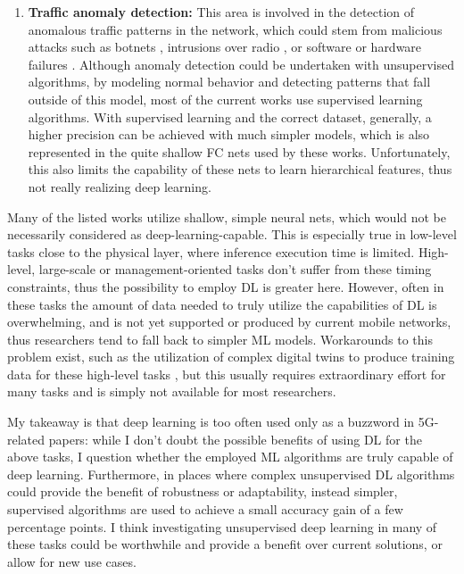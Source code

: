\begin{enumerate}[label=\textbf{\alph*})]
				\item
					\textbf{Traffic anomaly detection:}
					This area is involved in the detection of anomalous traffic patterns in the network, which could stem from malicious attacks such as botnets \cite{anomaly_botnet}, intrusions over radio \cite{anomaly_intrusion}, or software or hardware failures \cite{anomaly_sleeping}.
					Although anomaly detection could be undertaken with unsupervised algorithms, by modeling normal behavior and detecting patterns that fall outside of this model, most of the current works use supervised learning algorithms.
					With supervised learning and the correct dataset, generally, a higher precision can be achieved with much simpler models, which is also represented in the quite shallow \ac{FC} nets used by these works.
					Unfortunately, this also limits the capability of these nets to learn hierarchical features, thus not really realizing deep learning.		
			\end{enumerate}
		
			Many of the listed works utilize shallow, simple neural nets, which would not be necessarily considered as deep-learning-capable.
			This is especially true in low-level tasks close to the physical layer, where inference execution time is limited.
			High-level, large-scale or management-oriented tasks don't suffer from these timing constraints, thus the possibility to employ \ac{DL} is greater here.
			However, often in these tasks the amount of data needed to truly utilize the capabilities of \ac{DL} is overwhelming, and is not yet supported or produced by current mobile networks, thus researchers tend to fall back to simpler \ac{ML} models.
			Workarounds to this problem exist, such as the utilization of complex digital twins to produce training data for these high-level tasks \cite{dl_digital_twin}, but this usually requires extraordinary effort for many tasks and is simply not available for most researchers.			
			
			My takeaway is that deep learning is too often used only as a buzzword in \ac{5G}-related papers: while I don't doubt the possible benefits of using \ac{DL} for the above tasks, I question whether the employed \ac{ML} algorithms are truly capable of deep learning.
			Furthermore, in places where complex unsupervised \ac{DL} algorithms could provide the benefit of robustness or adaptability, instead simpler, supervised algorithms are used to achieve a small accuracy gain of a few percentage points.
			I think investigating unsupervised deep learning in many of these tasks could be worthwhile and provide a benefit over current solutions, or allow for new use cases.			

